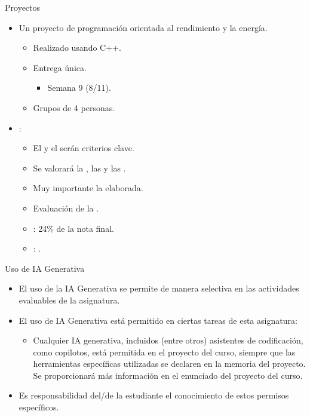 \begin{frame}[t]{Proyectos}
\begin{itemize}
  \item Un proyecto de programación orientada al rendimiento y la energía.
    \begin{itemize}
      \item Realizado usando C++.
      \item Entrega única.
        \begin{itemize}
          \item Semana 9 (8/11).
        \end{itemize}
      \item Grupos de 4 personas.
    \end{itemize}

  \item {}:
    \begin{itemize}
      \item El  y el  serán criterios clave.
      \item Se valorará la , las 
             y las .
      \item Muy importante la  elaborada.
      \item Evaluación de la .
      \item {}: 24\% de la nota final.
      \item {}: .
    \end{itemize}
\end{itemize}
\end{frame}

\begin{frame}[t]{Uso de IA Generativa}
\begin{itemize}

\item El uso de la IA Generativa se permite de manera selectiva en las actividades evaluables de la asignatura.

\item El uso de IA Generativa está permitido en ciertas tareas de esta asignatura:

  \begin{itemize}

    \item Cualquier IA generativa, incluidos (entre otros) asistentes de codificación, como copilotos, está permitida en el proyecto del curso, siempre que las herramientas específicas utilizadas se declaren en la memoria del proyecto. Se proporcionará más información en el enunciado del proyecto del curso.

  \end{itemize}

\item Es responsabilidad del/de la estudiante el conocimiento de estos permisos específicos. 
\end{itemize}
\end{frame}

